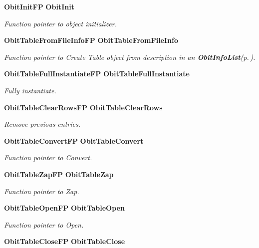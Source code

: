 \begin{CompactItemize}
{\bf Obit\-Init\-FP} {\bf Obit\-Init}
\begin{CompactList}\small\item\em Function pointer to object initializer. \item\end{CompactList}\item 
{\bf Obit\-Table\-From\-File\-Info\-FP} {\bf Obit\-Table\-From\-File\-Info}
\begin{CompactList}\small\item\em Function pointer to Create Table object from description in an {\bf Obit\-Info\-List}{\rm (p.\,\pageref{structObitInfoList})}. \item\end{CompactList}\item 
{\bf Obit\-Table\-Full\-Instantiate\-FP} {\bf Obit\-Table\-Full\-Instantiate}
\begin{CompactList}\small\item\em Fully instantiate. \item\end{CompactList}\item 
{\bf Obit\-Table\-Clear\-Rows\-FP} {\bf Obit\-Table\-Clear\-Rows}
\begin{CompactList}\small\item\em Remove previous entries. \item\end{CompactList}\item 
{\bf Obit\-Table\-Convert\-FP} {\bf Obit\-Table\-Convert}
\begin{CompactList}\small\item\em Function pointer to Convert. \item\end{CompactList}\item 
{\bf Obit\-Table\-Zap\-FP} {\bf Obit\-Table\-Zap}
\begin{CompactList}\small\item\em Function pointer to Zap. \item\end{CompactList}\item 
{\bf Obit\-Table\-Open\-FP} {\bf Obit\-Table\-Open}
\begin{CompactList}\small\item\em Function pointer to Open. \item\end{CompactList}\item 
{\bf Obit\-Table\-Close\-FP} {\bf Obit\-Table\-Close}

\end{CompactItemize}
